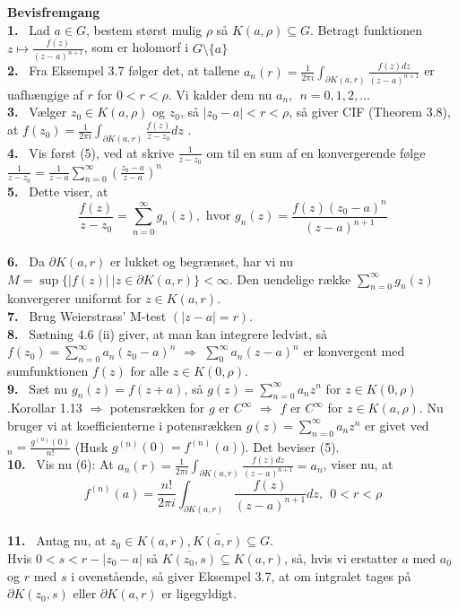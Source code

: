 \documentclass[10pt,a4paper]{article}
\theoremstyle{definition}
\begin{document}
\begin{framed}
\textbf{Bevisfremgang} \\
\textbf{1.} \ Lad $a \in G$, bestem størst mulig $\rho$ så $K(a,\rho) \subseteq G$. Betragt funktionen $ z \mapsto \frac{f(z)}{(z-a)^{n+1}}$, som er holomorf i $G \setminus \{a\}$\\
\textbf{2.} \ Fra Eksempel 3.7 følger det, at tallene $ a_n (r) = \frac{1}{2 \pi i} \int_{\partial K(a,r)} \frac{f(z) dz}{(z-a)^{n+1}} $ er uafhængige af $r$ for $0 < r < \rho$. Vi kalder dem nu $a_n, \ \ n= 0,1,2,...$ \\
\textbf{3.} \ Vælger $z_0 \in K(a,\rho)$ og $z_0$, så $\left| z_0 - a \right| < r < \rho$, så giver CIF (Theorem 3.8), at $ f(z_0) = \frac{1}{2 \pi i} \int_{\partial K(a,r)} \frac{f(z)}{z-z_0}dz$ .\\
\textbf{4.} \ Vis først (5), ved at skrive $\frac{1}{z-z_0}$ om til en sum af en konvergerende følge $\frac{1}{z-z_0} = \frac{1}{z-a} \sum_{n=0}^\infty \left(\frac{z_0-a}{z-a}\right)^n$\\
\textbf{5.} \ Dette viser, at
$$ \frac{f(z)}{z-z_0} = \sum_{n=0}^\infty g_n(z), \text{ hvor } g_n(z) = \frac{f(z)(z_0-a)^n}{(z-a)^{n+1}}$$ \\
\textbf{6.} \ Da $\partial K(a,r)$ er lukket og begrænset, har vi nu $M= \sup \{ \left| f(z) \right|  \ | z \in \partial K(a,r) \} < \infty$. Den uendelige række $\sum_{n=0}^\infty g_n(z)$ konvergerer uniformt for $z \in K(a,r)$.  \\
\textbf{7.} \ Brug Weierstrass' M-test $(\left| z-a \right| = r)$.\\
\textbf{8.} \ Sætning 4.6 (ii) giver, at man kan integrere ledvist, så 
$f(z_0) = \sum_{n=0}^\infty a_n (z_0 - a)^n$ $\Rightarrow$ $\sum_0^\infty a_n(z-a)^n$ er konvergent med sumfunktionen $f(z)$ for alle $z \in K(0, \rho)$. \\
\textbf{9.} \ Sæt nu $g_n(z) = f (z+a)$, så $g(z) = \sum_{n=0}^\infty a_n z^n$ for $z \in K(0,\rho)$.Korollar 1.13 $\Rightarrow$ potensrækken for $g$ er $C^\infty$ $\Rightarrow$ $f$ er $C^\infty$ for $z \in K(a, \rho)$. Nu bruger vi at koefficienterne i potensrækken $g(z)=\sum_{n=0}^\infty a_n z^n$ er givet ved $_n= \frac{g^{(n)}(0)}{n!}$ (Husk $g^{(n)}(0)=f^{(n)}(a)$). Det beviser (5).\\
\textbf{10.} \ Vis nu (6): At $ a_n (r) = \frac{1}{2 \pi i} \int_{\partial K(a,r)} \frac{f(z) dz}{(z-a)^{n+1}}=a_n $, viser nu, at
$$f^{(n)}(a) = \frac{n!}{2 \pi i} \int_{\partial K(a,r)} \frac{f(z)}{(z-a)^{n+1}}dz, \ \ 0<r<\rho$$\\
\textbf{11.} \ Antag nu, at $z_0 \in K(a,r), \bar{K(a,r)} \subseteq G$. \\
Hvis $0<s<r-|z_0-a|$ så $\overline{K(z_0,s)} \subseteq K(a,r)$, så, hvis vi erstatter $a$ med $a_0$ og $r$ med $s$ i ovenstående, så giver Eksempel 3.7, at om intgralet tages på $\partial K(z_0,s)$ eller $\partial K(a,r)$ er ligegyldigt.
\end{framed}
\end{document}
